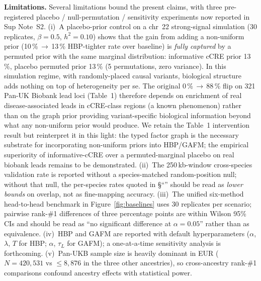 \textbf{Limitations.} Several limitations bound the present
claims, with three pre-registered placebo / null-permutation /
sensitivity experiments now reported in Sup Note~S2. (i)~A
placebo-prior control on a chr~22 strong-signal simulation
(30 replicates, $\beta{=}0.5$, $h^2{=}0.10$) shows that the gain
from adding a non-uniform prior (10\,\%\,$\to$\,13\,\%
HBP-tighter rate over baseline) is \emph{fully captured} by a
permuted prior with the same marginal distribution: informative
cCRE prior 13\,\%, placebo permuted prior 13\,\% (5 permutations,
zero variance). In this simulation regime, with randomly-placed
causal variants, biological structure adds nothing on top of
heterogeneity per se. The original 0\,\%\,$\to$\,88\,\% flip on
321 Pan-UK Biobank lead loci (Table~1) therefore depends on
enrichment of real disease-associated leads in cCRE-class regions
(a known phenomenon) rather than on the graph prior providing
variant-specific biological information beyond what any
non-uniform prior would produce. We retain the Table~1
intervention result but reinterpret it in this light: the typed
factor graph is the necessary substrate for incorporating
non-uniform priors into HBP/GAFM; the empirical superiority of
informative-cCRE over a permuted-marginal placebo on real
biobank leads remains to be demonstrated. (ii)~The 250\,kb-window cross-species
validation rate is reported without a species-matched
random-position null; without that null, the per-species rates
quoted in §``'' should be read as
\emph{lower bounds} on overlap, not as fine-mapping accuracy. (iii)~The
unified six-method head-to-head benchmark in Figure~\ref{fig:baselines}
uses 30 replicates per scenario; pairwise rank-\#1 differences of
three percentage points are within Wilson 95\% CIs and should be
read as ``no significant difference at $\alpha=0.05$'' rather than
as equivalence. (iv)~HBP and GAFM are reported with default
hyperparameters ($\alpha$, $\lambda$, $T$ for HBP; $\alpha$,
$\tau_L$ for GAFM); a one-at-a-time sensitivity analysis is
forthcoming. (v)~Pan-UKB sample size is heavily dominant in EUR
($N=420{,}531$ vs $\leq 8{,}876$ in the three other ancestries),
so cross-ancestry rank-\#1 comparisons confound ancestry effects
with statistical power.


